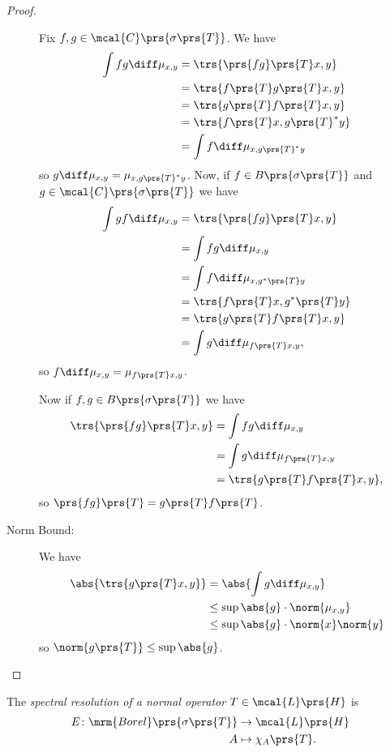 \documentclass[10pt, twoside]{book}
\begin{document}
\begin{proof}
\begin{description}
Fix $f,g \in \mcal{C}\prs{\sigma\prs{T}}$. We have
\begin{align*}
\int fg \diff \mu_{x,y} &= \trs{\prs{fg}\prs{T} x, y}
\\&= \trs{f\prs{T} g\prs{T} x, y}
\\&= \trs{g\prs{T} f\prs{T} x, y}
\\&= \trs{f\prs{T} x, g\prs{T}^* y}
\\&= \int f \diff\mu_{x, g\prs{T}^* y}
\end{align*}
so $g \diff \mu_{x,y} = \mu_{x, g\prs{T}^* y}$.
Now, if $f \in B\prs{\sigma\prs{T}}$ and $g \in \mcal{C}\prs{\sigma\prs{T}}$ we have
\begin{align*}
\int gf \diff \mu_{x,y} &= \trs{\prs{fg}\prs{T} x, y}
\\&= \int fg \diff \mu_{x,y}
\\&= \int f\diff \mu_{x, g^*\prs{T} y}
\\&= \trs{f\prs{T} x, g^*\prs{T} y}
\\&= \trs{g\prs{T} f\prs{T} x, y}
\\&= \int g \diff \mu_{f\prs{T} x, y} \text{,}
\end{align*}
so $f \diff \mu_{x,y} = \mu_{f\prs{T} x,y}$.

Now if $f,g \in B\prs{\sigma\prs{T}}$ we have
\begin{align*}
\trs{\prs{fg}\prs{T} x,y} &= \int fg \diff \mu_{x,y}
\\&= \int g \diff \mu_{f\prs{T} x, y}
\\&= \trs{g\prs{T} f\prs{T} x, y} \text{,}
\end{align*}
so $\prs{fg}\prs{T} = g\prs{T} f\prs{T}$.

\item[Norm Bound:]
We have
\begin{align*}
\abs{\trs{g\prs{T} x, y}} &= \abs{\int g\diff \mu_{x,y}}
\\&\leq \sup \abs{g} \cdot \norm{\mu_{x,y}}
\\&\leq \sup\abs{g} \cdot \norm{x} \norm{y}
\end{align*}
so $\norm{g\prs{T}} \leq \sup \abs{g}$.
\end{description}
\end{proof}

\begin{definition}
The \emph{spectral resolution of a normal operator $T \in \mcal{L}\prs{H}$} is
\begin{align*}
E \colon \mrm{Borel}\prs{\sigma\prs{T}} &\to \mcal{L}\prs{H} \\
A &\mapsto \chi_A\prs{T} \text{.}
\end{align*}
\end{definition}
\end{document}
